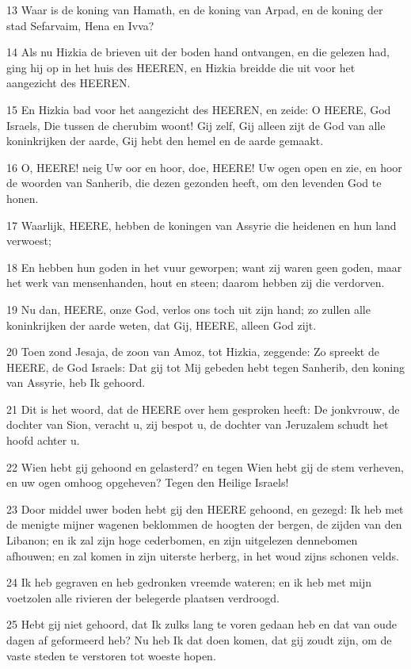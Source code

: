 \par 13 Waar is de koning van Hamath, en de koning van Arpad, en de koning der stad Sefarvaim, Hena en Ivva?
\par 14 Als nu Hizkia de brieven uit der boden hand ontvangen, en die gelezen had, ging hij op in het huis des HEEREN, en Hizkia breidde die uit voor het aangezicht des HEEREN.
\par 15 En Hizkia bad voor het aangezicht des HEEREN, en zeide: O HEERE, God Israels, Die tussen de cherubim woont! Gij zelf, Gij alleen zijt de God van alle koninkrijken der aarde, Gij hebt den hemel en de aarde gemaakt.
\par 16 O, HEERE! neig Uw oor en hoor, doe, HEERE! Uw ogen open en zie, en hoor de woorden van Sanherib, die dezen gezonden heeft, om den levenden God te honen.
\par 17 Waarlijk, HEERE, hebben de koningen van Assyrie die heidenen en hun land verwoest;
\par 18 En hebben hun goden in het vuur geworpen; want zij waren geen goden, maar het werk van mensenhanden, hout en steen; daarom hebben zij die verdorven.
\par 19 Nu dan, HEERE, onze God, verlos ons toch uit zijn hand; zo zullen alle koninkrijken der aarde weten, dat Gij, HEERE, alleen God zijt.
\par 20 Toen zond Jesaja, de zoon van Amoz, tot Hizkia, zeggende: Zo spreekt de HEERE, de God Israels: Dat gij tot Mij gebeden hebt tegen Sanherib, den koning van Assyrie, heb Ik gehoord.
\par 21 Dit is het woord, dat de HEERE over hem gesproken heeft: De jonkvrouw, de dochter van Sion, veracht u, zij bespot u, de dochter van Jeruzalem schudt het hoofd achter u.
\par 22 Wien hebt gij gehoond en gelasterd? en tegen Wien hebt gij de stem verheven, en uw ogen omhoog opgeheven? Tegen den Heilige Israels!
\par 23 Door middel uwer boden hebt gij den HEERE gehoond, en gezegd: Ik heb met de menigte mijner wagenen beklommen de hoogten der bergen, de zijden van den Libanon; en ik zal zijn hoge cederbomen, en zijn uitgelezen dennebomen afhouwen; en zal komen in zijn uiterste herberg, in het woud zijns schonen velds.
\par 24 Ik heb gegraven en heb gedronken vreemde wateren; en ik heb met mijn voetzolen alle rivieren der belegerde plaatsen verdroogd.
\par 25 Hebt gij niet gehoord, dat Ik zulks lang te voren gedaan heb en dat van oude dagen af geformeerd heb? Nu heb Ik dat doen komen, dat gij zoudt zijn, om de vaste steden te verstoren tot woeste hopen.
